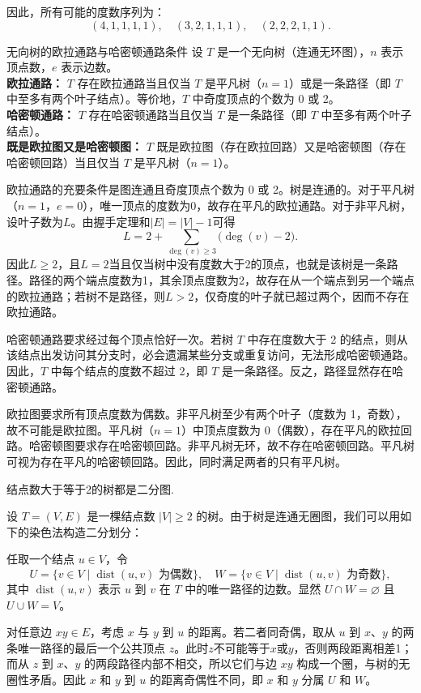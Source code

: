 \documentclass[lang=cn,11pt]{elegantbook}
\begin{document}
因此，所有可能的度数序列为：
\[
(4,1,1,1,1), \quad (3,2,1,1,1), \quad (2,2,2,1,1).
\]
\begin{theorem}{无向树的欧拉通路与哈密顿通路条件}
设 $T$ 是一个无向树（连通无环图），$n$ 表示顶点数，$e$ 表示边数。\\
\textbf{欧拉通路：} $T$ 存在欧拉通路当且仅当 $T$ 是平凡树（$n=1$）或是一条路径（即 $T$ 中至多有两个叶子结点）。等价地，$T$ 中奇度顶点的个数为 0 或 2。\\
\textbf{哈密顿通路：} $T$ 存在哈密顿通路当且仅当 $T$ 是一条路径（即 $T$ 中至多有两个叶子结点）。\\
\textbf{既是欧拉图又是哈密顿图：} $T$ 既是欧拉图（存在欧拉回路）又是哈密顿图（存在哈密顿回路）当且仅当 $T$ 是平凡树（$n=1$）。
\end{theorem}
欧拉通路的充要条件是图连通且奇度顶点个数为 0 或 2。树是连通的。对于平凡树（$n=1$，$e=0$），唯一顶点的度数为0，故存在平凡的欧拉通路。对于非平凡树，设叶子数为$L$。由握手定理和$|E|=|V|-1$可得
\[
L=2+\sum_{\deg(v)\geqslant3}\bigl(\deg(v)-2\bigr).
\]
因此$L\geqslant2$，且$L=2$当且仅当树中没有度数大于2的顶点，也就是该树是一条路径。路径的两个端点度数为1，其余顶点度数为2，故存在从一个端点到另一个端点的欧拉通路；若树不是路径，则$L>2$，仅奇度的叶子就已超过两个，因而不存在欧拉通路。

哈密顿通路要求经过每个顶点恰好一次。若树 $T$ 中存在度数大于 2 的结点，则从该结点出发访问其分支时，必会遗漏某些分支或重复访问，无法形成哈密顿通路。因此，$T$ 中每个结点的度数不超过 2，即 $T$ 是一条路径。反之，路径显然存在哈密顿通路。

欧拉图要求所有顶点度数为偶数。非平凡树至少有两个叶子（度数为 1，奇数），故不可能是欧拉图。平凡树（$n=1$）中顶点度数为 0（偶数），存在平凡的欧拉回路。哈密顿图要求存在哈密顿回路。非平凡树无环，故不存在哈密顿回路。平凡树可视为存在平凡的哈密顿回路。因此，同时满足两者的只有平凡树。
\begin{theorem}
结点数大于等于2的树都是二分图.
\end{theorem}
设 \(T = (V, E)\) 是一棵结点数 \(|V| \ge 2\) 的树。由于树是连通无圈图，我们可以用如下的染色法构造二分划分：

任取一个结点 \(u \in V\)，令
\[
U = \{ v \in V \mid \operatorname{dist}(u, v) \text{ 为偶数} \},
\quad W = \{ v \in V \mid \operatorname{dist}(u, v) \text{ 为奇数} \},
\]
其中 \(\operatorname{dist}(u, v)\) 表示 \(u\) 到 \(v\) 在 \(T\) 中的唯一路径的边数。显然 \(U \cap W = \varnothing\) 且 \(U \cup W = V\)。

对任意边 \(xy \in E\)，考虑 \(x\) 与 \(y\) 到 \(u\) 的距离。若二者同奇偶，取从 \(u\) 到 \(x\)、\(y\) 的两条唯一路径的最后一个公共顶点 \(z\)。此时$z$不可能等于$x$或$y$，否则两段距离相差1；而从 \(z\) 到 \(x\)、\(y\) 的两段路径内部不相交，所以它们与边 \(xy\) 构成一个圈，与树的无圈性矛盾。因此 \(x\) 和 \(y\) 到 \(u\) 的距离奇偶性不同，即 \(x\) 和 \(y\) 分属 \(U\) 和 \(W\)。
\end{document}
